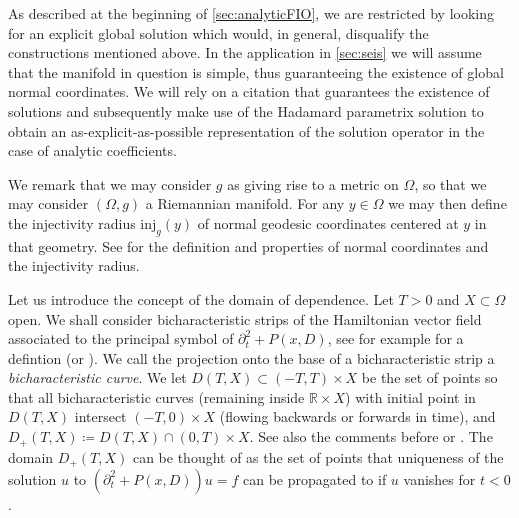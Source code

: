 \documentclass[
	fontsize=11pt, 
	twoside=false, 
	abstract=true, 
	a4paper,
]{scrartcl}
\newcommand{\RR}{\mathbb{R}}
\newcommand{\del}{\partial}
\begin{document}
As described at the beginning of \cref{sec:analyticFIO}, we are restricted by looking for an explicit global solution which would, in general, disqualify the constructions mentioned above. In the application in \cref{sec:seis} we will assume that the manifold in question is simple, thus guaranteeing the existence of global normal coordinates. 
We will rely on a citation that guarantees the existence of solutions and subsequently make use of the Hadamard parametrix solution to obtain an as-explicit-as-possible representation of the solution operator in the case of analytic coefficients.

We remark that we may consider $g$ as giving rise to a metric on $\Omega$, so that we may consider $(\Omega,g)$ a Riemannian manifold. For any $y\in \Omega$ we may then define the injectivity radius $\mathrm{inj}_g(y)$ of normal geodesic coordinates centered at $y$ in that geometry. See \cite{zbMATH06897812} for the definition and properties of normal coordinates and the injectivity radius.

Let us introduce the concept of the domain of dependence. Let $T>0$ and $X\subset \Omega$ open. We shall consider bicharacteristic strips of the Hamiltonian vector field associated to the principal symbol of $\del_t^2+P(x,D)$, see for example \cite[\S~6.4]{hoermander1} for a defintion (or \cite[\S~7]{zbMATH03359011}). We call the projection onto the base of a bicharacteristic strip a \emph{bicharacteristic curve}. We let $D(T,X) \subset (-T,T)\times X$ be the set of points so that all bicharacteristic curves (remaining inside $\RR\times X$) with initial point in $D(T,X)$ intersect $(-T,0)\times X$ (flowing backwards or forwards in time), and $D_+(T,X)\coloneqq D(T,X)\cap (0,T)\times X$. See also the comments before \cite[Thm.~5.1.6]{zbMATH05817029} or \cite[Def.~4.2.1]{zbMATH03495276}. The domain $D_+(T,X)$ can be thought of as the set of points that uniqueness of the solution $u$ to $(\del_t^2+P(x,D))u=f$ can be propagated to if $u$ vanishes for $t<0$. 
\end{document}
